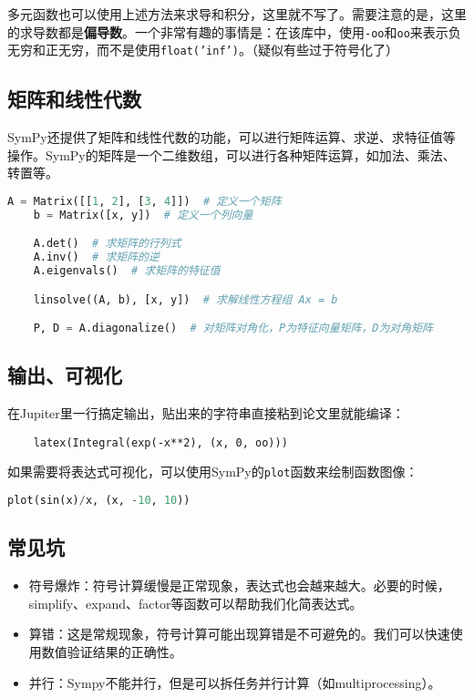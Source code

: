 \documentclass[../main.tex]{subfiles}
\begin{document}
多元函数也可以使用上述方法来求导和积分，这里就不写了。需要注意的是，这里的求导数都是\textbf{偏导数}。一个非常有趣的事情是：在该库中，使用\texttt{-oo}和\texttt{oo}来表示负无穷和正无穷，而不是使用\texttt{float('inf')}。（疑似有些过于符号化了）

\subsection{矩阵和线性代数}
SymPy还提供了矩阵和线性代数的功能，可以进行矩阵运算、求逆、求特征值等操作。SymPy的矩阵是一个二维数组，可以进行各种矩阵运算，如加法、乘法、转置等。
\begin{lstlisting}[language=python]
    A = Matrix([[1, 2], [3, 4]])  # 定义一个矩阵
    b = Matrix([x, y])  # 定义一个列向量

    A.det()  # 求矩阵的行列式
    A.inv()  # 求矩阵的逆
    A.eigenvals()  # 求矩阵的特征值

    linsolve((A, b), [x, y])  # 求解线性方程组 Ax = b

    P, D = A.diagonalize()  # 对矩阵对角化，P为特征向量矩阵，D为对角矩阵
\end{lstlisting}

\subsection{输出、可视化}
在Jupiter里一行搞定输出，贴出来的字符串直接粘到论文里就能编译：
\begin{lstlisting}
    latex(Integral(exp(-x**2), (x, 0, oo)))
\end{lstlisting}

如果需要将表达式可视化，可以使用SymPy的\texttt{plot}函数来绘制函数图像：
\begin{lstlisting}[language=python]
    plot(sin(x)/x, (x, -10, 10))
\end{lstlisting}

\subsection{常见坑}
\begin{itemize}
  \item 符号爆炸：符号计算缓慢是正常现象，表达式也会越来越大。必要的时候，simplify、expand、factor等函数可以帮助我们化简表达式。
  \item 算错：这是常规现象，符号计算可能出现算错是不可避免的。我们可以快速使用数值验证结果的正确性。
  \item 并行：Sympy不能并行，但是可以拆任务并行计算（如multiprocessing）。
\end{itemize}
\end{document}
